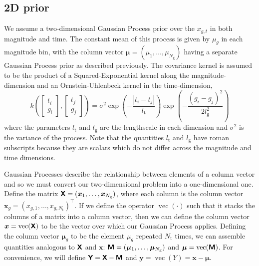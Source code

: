 \documentclass[fleqn,usenatbib]{mnras}
\begin{document}
\subsection{2D prior}
We assume a two-dimensional Gaussian Process prior over the $x_{g,t}$ in both magnitude and time. The constant mean of this process is given by $\mu_g$ in each magnitude bin, with the column vector $\boldsymbol{\mu}=(\mu_1,\dots,\mu_{N_\text{g}})$ having a separate Gaussian Process prior as described previously. The covariance kernel is assumed to be the product of a Squared-Exponential kernel along the magnitude-dimension and an Ornstein-Uhlenbeck kernel in the time-dimension,
\begin{equation}
    k\left(\begin{bmatrix} t_i \\ g_i \end{bmatrix}, \begin{bmatrix} t_j \\ g_j \end{bmatrix}\right)= \sigma^2 \exp\left(-\frac{|t_i-t_j|}{l_{\mathrm{t}}}\right) \exp\left(-\frac{(g_i-g_j)^2}{2l_{\mathrm{g}}^2}\right) 
\end{equation}
where the parameters $l_\text{t}$ and $l_\text{g}$ are the lengthscale in each dimension and $\sigma^2$ is the variance of the process. Note that the quantities $l_\text{t}$ and $l_\text{g}$ have roman subscripts because they are scalars which do not differ across the magnitude and time dimensions.

Gaussian Processes describe the relationship between elements of a column vector and so we must convert our two-dimensional problem into a one-dimensional one. Define the matrix $\textbf{\textsf{X}}=(\bm{x}_1,\dots,\bm{x}_{N_\text{g}})$, where each column is the column vector $\bm{x}_g = (x_{g,1},\dots,x_{g,N_\text{t}})^\intercal$. If we define the operator $\operatorname{vec}(\cdot)$ such that it stacks the columns of a matrix into a column vector, then we can define the column vector $\bm{x}=\operatorname{vec}(\textbf{\textsf{X}})$ to be the vector over which our Gaussian Process applies. Defining the column vector $\boldsymbol{\mu}_g$ to be the element $\mu_g$ repeated $N_\text{t}$ times, we can assemble quantities analogous to $\textbf{\textsf{X}}$ and $\bm{x}$: $\textbf{\textsf{M}}=(\bm{\mu}_1,\dots,\bm{\mu}_{N_\text{g}})$ and $\bm{\mu}=\operatorname{vec}(\textbf{\textsf{M}})$. For convenience, we will define $\textbf{\textsf{Y}} = \textbf{\textsf{X}}-\textbf{\textsf{M}}$ and $\bm{y}=\operatorname{vec}(Y)=\bm{x}-\boldsymbol{\mu}$. 
\end{document}
